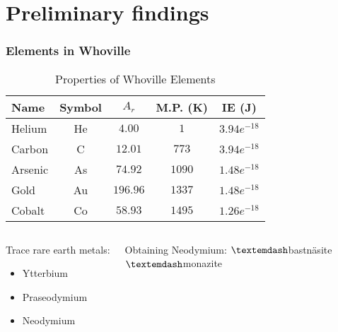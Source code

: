 \documentclass{beamer}
\begin{document}
\section{Preliminary findings}
\begin{frame}
    \frametitle{Elements in Whoville}

    \vspace{1cm} %
    \begin{table}[h]
    \centering
    \begin{tabular}{lcccc} \bottomrule[2pt]
        Name & Symbol & $A_r$ & M.P. (K) & IE (J) \\ \bottomrule 
        Helium & He & $4.00$ & $1$ & $3.94e^{-18}$ \\
        Carbon & C & $12.01$ & $773$ & $3.94e^{-18}$ \\
        Arsenic & As & $74.92$ & $1090$ & $1.48e^{-18}$ \\
        Gold & Au & $196.96$ & $1337$ & $1.48e^{-18}$ \\
        Cobalt & Co & $58.93$ & $1495$ & $1.26e^{-18}$ \\
    \bottomrule[2pt]
    \end{tabular}
    \caption{Properties of Whoville Elements}
    \end{table}

\vspace{-0.6cm} %

    \begin{columns}[t]
    \column{4.5cm}
    \begin{block}{Trace rare earth metals:}
    \begin{itemize}
        \item{Ytterbium}
        \item{Praseodymium}
        \item{Neodymium}
    \end{itemize}
    \end{block}
    \column{4.5cm}
    \begin{block}{Obtaining Neodymium:}
        \vspace{0.15cm}
        $\textemdash$bastn\"{a}site \\
        $\textemdash${monazite} \\
    \end{block}
    \end{columns}


\end{frame}
\end{document}
